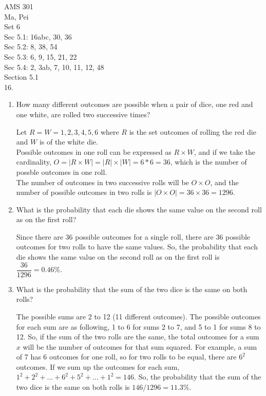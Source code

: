 \documentclass[12pt]{article}
\begin{document}
\noindent
AMS 301\\
Ma, Pei \\
Set 6\\

Sec 5.1: 16abc, 30, 36\\
Sec 5.2: 8, 38, 54\\
Sec 5.3: 6, 9, 15, 21, 22\\ 
Sec 5.4: 2, 3ab, 7, 10, 11, 12, 48\\

Section 5.1\\
16. \begin{enumerate}[label=(\alph*)]
    \item How many different outcomes are possible when 
    a pair of dice, one red and one white, 
    are rolled two successive times? 
    \begin{solution}
        Let $R = W = {1, 2, 3, 4, 5, 6}$ where $R$ is the set 
        outcomes of rolling the red die and $W$ is of the white die.\\
        Possible outcomes in one roll can be expressed as $R \times W$, 
        and if we take the cardinality, $O=|R\times W| = |R| \times |W|
        =6*6=36$, which is the number of possble outcomes in one roll.\\
        The number of outcomes in two successive rolls will be 
        $O\times O$, and the number of possible outcomes in two rolls 
        is $|O\times O|=36\times36 = 1296$. 
    \end{solution}
    \item What is the probability that each die shows the 
    same value on the second roll as on the first roll? 
    \begin{solution}
        Since there are 36 possible outcomes for a single roll, 
        there are 36 possible outcomes for two rolls to have the
        same values. So, the probability that each die shows the 
        same value on the second roll as on the first roll is 
        $\dfrac{36}{1296} = 0.46\%$. 
    \end{solution}
    \item What is the probability that the sum of the 
    two dice is the same on both rolls?
    \begin{solution}
        The possible sums are 2 to 12 (11 different outcomes). 
        The possible outcomes for each sum are as following, 
        1 to 6 for sums 2 to 7, and 5 to 1 for sums 8 to 12. 
        So, if the sum of the two rolls are the same, the total
        outcomes for a sum $x$ will be the number of outcomes
        for that sum squared. For example, a sum of 7 has 6 
        outcomes for one roll, so for two rolls to be 
        equal, there are $6^2$ outcomes. If we sum up the outcomes 
        for each sum, $1^2+2^2+...+6^2+5^2+...+1^2=146$. 
        So, the probability that the sum of the two dice is 
        the same on both rolls is $146/1296 = 11.3\%$. 
    \end{solution} 
\end{enumerate}
\end{document}
